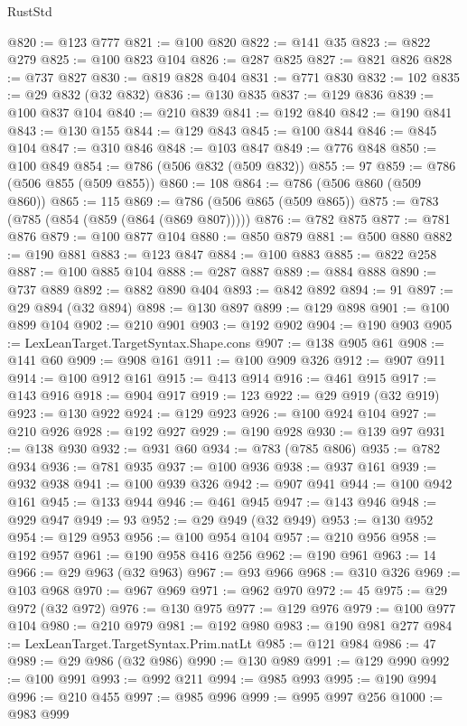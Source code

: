\begin{lexlean}{RustStd}
\begin{coremodule}
{\begin{coremodule}
{{{{{{{{{{{{{{{{{{{{{{{{{{{{{{{{{{{{{{{{{{{{{{{{{{{{{{{@820 := @123 @777
@821 := @100 @820
@822 := @141 @35
@823 := @822 @279
@825 := @100 @823 @104
@826 := @287 @825
@827 := @821 @826
@828 := @737 @827
@830 := @819 @828 @404
@831 := @771 @830
@832 := 102
@835 := @29 @832 (@32 @832)
@836 := @130 @835
@837 := @129 @836
@839 := @100 @837 @104
@840 := @210 @839
@841 := @192 @840
@842 := @190 @841
@843 := @130 @155
@844 := @129 @843
@845 := @100 @844
@846 := @845 @104
@847 := @310 @846
@848 := @103 @847
@849 := @776 @848
@850 := @100 @849
@854 := @786 (@506 @832 (@509 @832))
@855 := 97
@859 := @786 (@506 @855 (@509 @855))
@860 := 108
@864 := @786 (@506 @860 (@509 @860))
@865 := 115
@869 := @786 (@506 @865 (@509 @865))
@875 := @783 (@785 (@854 (@859 (@864 (@869 @807)))))
@876 := @782 @875
@877 := @781 @876
@879 := @100 @877 @104
@880 := @850 @879
@881 := @500 @880
@882 := @190 @881
@883 := @123 @847
@884 := @100 @883
@885 := @822 @258
@887 := @100 @885 @104
@888 := @287 @887
@889 := @884 @888
@890 := @737 @889
@892 := @882 @890 @404
@893 := @842 @892
@894 := 91
@897 := @29 @894 (@32 @894)
@898 := @130 @897
@899 := @129 @898
@901 := @100 @899 @104
@902 := @210 @901
@903 := @192 @902
@904 := @190 @903
@905 := LexLeanTarget.TargetSyntax.Shape.cons
@907 := @138 @905 @61
@908 := @141 @60
@909 := @908 @161
@911 := @100 @909 @326
@912 := @907 @911
@914 := @100 @912 @161
@915 := @413 @914
@916 := @461 @915
@917 := @143 @916
@918 := @904 @917
@919 := 123
@922 := @29 @919 (@32 @919)
@923 := @130 @922
@924 := @129 @923
@926 := @100 @924 @104
@927 := @210 @926
@928 := @192 @927
@929 := @190 @928
@930 := @139 @97
@931 := @138 @930
@932 := @931 @60
@934 := @783 (@785 @806)
@935 := @782 @934
@936 := @781 @935
@937 := @100 @936
@938 := @937 @161
@939 := @932 @938
@941 := @100 @939 @326
@942 := @907 @941
@944 := @100 @942 @161
@945 := @133 @944
@946 := @461 @945
@947 := @143 @946
@948 := @929 @947
@949 := 93
@952 := @29 @949 (@32 @949)
@953 := @130 @952
@954 := @129 @953
@956 := @100 @954 @104
@957 := @210 @956
@958 := @192 @957
@961 := @190 @958 @416 @256
@962 := @190 @961
@963 := 14
@966 := @29 @963 (@32 @963)
@967 := @93 @966
@968 := @310 @326
@969 := @103 @968
@970 := @967 @969
@971 := @962 @970
@972 := 45
@975 := @29 @972 (@32 @972)
@976 := @130 @975
@977 := @129 @976
@979 := @100 @977 @104
@980 := @210 @979
@981 := @192 @980
@983 := @190 @981 @277
@984 := LexLeanTarget.TargetSyntax.Prim.natLt
@985 := @121 @984
@986 := 47
@989 := @29 @986 (@32 @986)
@990 := @130 @989
@991 := @129 @990
@992 := @100 @991
@993 := @992 @211
@994 := @985 @993
@995 := @190 @994
@996 := @210 @455
@997 := @985 @996
@999 := @995 @997 @256
@1000 := @983 @999
}}}}}}}}}}}}}}}}}}}}}}}}}}}}}}}}}}}}}}}}}}}}}}}}}}}}}}}
\end{coremodule}}
\end{coremodule}
\end{lexlean}
